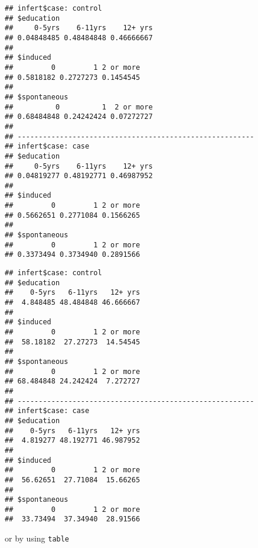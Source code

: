 \documentclass[]{book}
\newenvironment{Shaded}{\begin{snugshade}}{\end{snugshade}}
\newcommand{\KeywordTok}[1]{\textcolor[rgb]{0.13,0.29,0.53}{\textbf{{#1}}}}
\newcommand{\DecValTok}[1]{\textcolor[rgb]{0.00,0.00,0.81}{{#1}}}
\newcommand{\StringTok}[1]{\textcolor[rgb]{0.31,0.60,0.02}{{#1}}}
\newcommand{\NormalTok}[1]{{#1}}
\theoremstyle{definition}
\theoremstyle{definition}
\theoremstyle{remark}
\begin{document}
\begin{verbatim}
## infert$case: control
## $education
##     0-5yrs    6-11yrs    12+ yrs 
## 0.04848485 0.48484848 0.46666667 
## 
## $induced
##         0         1 2 or more 
## 0.5818182 0.2727273 0.1454545 
## 
## $spontaneous
##          0          1  2 or more 
## 0.68484848 0.24242424 0.07272727 
## 
## -------------------------------------------------------- 
## infert$case: case
## $education
##     0-5yrs    6-11yrs    12+ yrs 
## 0.04819277 0.48192771 0.46987952 
## 
## $induced
##         0         1 2 or more 
## 0.5662651 0.2771084 0.1566265 
## 
## $spontaneous
##         0         1 2 or more 
## 0.3373494 0.3734940 0.2891566
\end{verbatim}

\begin{Shaded}
\end{Shaded}

\begin{verbatim}
## infert$case: control
## $education
##    0-5yrs   6-11yrs   12+ yrs 
##  4.848485 48.484848 46.666667 
## 
## $induced
##         0         1 2 or more 
##  58.18182  27.27273  14.54545 
## 
## $spontaneous
##         0         1 2 or more 
## 68.484848 24.242424  7.272727 
## 
## -------------------------------------------------------- 
## infert$case: case
## $education
##    0-5yrs   6-11yrs   12+ yrs 
##  4.819277 48.192771 46.987952 
## 
## $induced
##         0         1 2 or more 
##  56.62651  27.71084  15.66265 
## 
## $spontaneous
##         0         1 2 or more 
##  33.73494  37.34940  28.91566
\end{verbatim}

or by using \texttt{table}

\begin{Shaded}
\end{Shaded}
\end{document}
